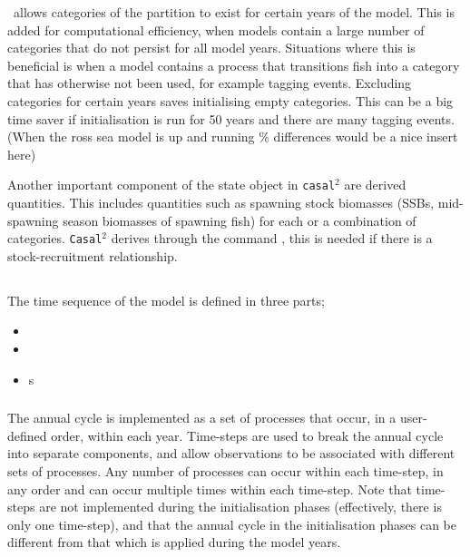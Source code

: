 \CNAME\ allows categories of the partition to exist for certain years of the model. This is added for computational efficiency, when models contain a large number of categories that do not persist for all model years. Situations where this is beneficial is when a model contains a process that transitions fish into a category that has otherwise not been used, for example tagging events. Excluding categories for certain years saves initialising empty categories. This can be a big time saver if initialisation is run for 50 years and there are many tagging events.(When the ross sea model is up and running \% differences would be a nice insert here)

Another important component of the state object in \texttt{casal$^2$} are derived quantities. This includes quantities such as spawning stock biomasses (SSBs, mid-spawning season biomasses of spawning fish) for each or a combination of categories. \texttt{Casal$^2$} derives through the command , this is needed if there is a stock-recruitment relationship.

\subsection{}

The time sequence of the model is defined in three parts;
\begin{itemize}
  \item {}
  \item {}
  \item {}s
\end{itemize}

\subsubsection{}

The annual cycle is implemented as a set of processes that occur, in a user-defined order, within each year. Time-steps are used to break the annual cycle into separate components, and allow observations to be associated with different sets of processes. Any number of processes can occur within each time-step, in any order and can occur multiple times within each time-step. Note that time-steps are not implemented during the initialisation phases (effectively, there is only one time-step), and that the annual cycle in the initialisation phases can be different from that which is applied during the model years.

